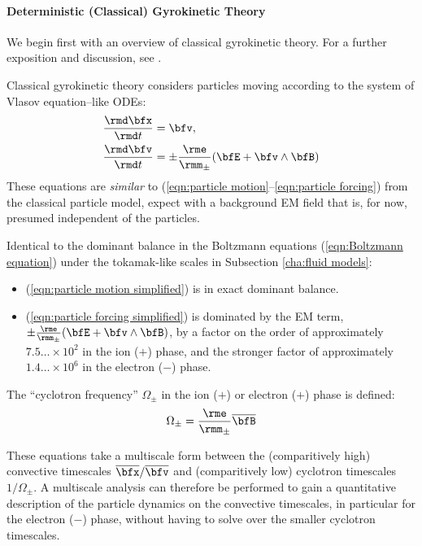 \paragraph*{Deterministic (Classical) Gyrokinetic Theory}
    We begin first with an overview of classical gyrokinetic theory. For a further exposition and discussion, see \cite{Woods_2006, Freidberg_2008, Chen_2015}.

    Classical gyrokinetic theory considers particles moving according to the system of Vlasov equation--like ODEs:
    \begin{align}
        \frac{\rmd\bfx}{\rmd t}  &=  \bfv,  \label{eqn:particle motion simplified}  \\
        \frac{\rmd\bfv}{\rmd t}  &=  \pm\frac{\rme}{\rmm_{\pm}}(\bfE + \bfv\wedge\bfB)  \label{eqn:particle forcing simplified}
    \end{align}
    These equations are \emph{similar} to (\ref{eqn:particle motion}--\ref{eqn:particle forcing}) from the classical particle model, expect with a background EM field that is, for now, presumed independent of the particles.
    
    Identical to the dominant balance in the Boltzmann equations (\ref{eqn:Boltzmann equation}) under the tokamak-like scales in Subsection \ref{cha:fluid models}:
    \begin{itemize}
        \item  (\ref{eqn:particle motion simplified}) is in exact dominant balance.
        \item  (\ref{eqn:particle forcing simplified}) is dominated by the EM term, $\pm\frac{\rme}{\rmm_{\pm}}(\bfE + \bfv\wedge\bfB)$, by a factor on the order of approximately $7.5\ldots\times 10^{2}$ in the ion ($+$) phase, and the stronger factor of approximately $1.4\ldots\times 10^{6}$ in the electron ($-$) phase. 
    \end{itemize}

    \begin{definition}
        The ``cyclotron frequency'' $\Omega_{\pm}$ in the ion ($+$) or electron ($+$) phase is defined: 
        \begin{equation}
            \Omega_{\pm}  =  \frac{\rme}{\rmm_{\pm}}\overline{\bfB}
        \end{equation}
    \end{definition}
    
    These equations take a multiscale form between the (comparitively high) convective timescales $\overline{\bfx}/\overline{\bfv}$ and (comparitively low) cyclotron timescales $1/\Omega_{\pm}$. A multiscale analysis \cite{Kevorkin_Cole_2012} can therefore be performed to gain a quantitative description of the particle dynamics on the convective timescales, in particular for the electron ($-$) phase, without having to solve over the smaller cyclotron timescales.

